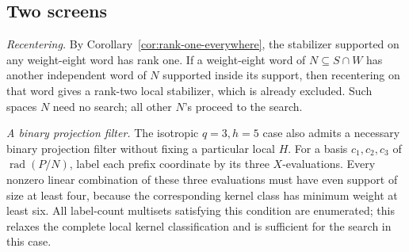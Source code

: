 \documentclass[11pt]{article}
\theoremstyle{definition}
\theoremstyle{remark}
\newcommand{\rad}{\operatorname{rad}}
\begin{document}
\subsection{Two screens}

\emph{Recentering.} By Corollary~\ref{cor:rank-one-everywhere}, the
stabilizer supported on any weight-eight word has rank one. If a
weight-eight word of \(N\subseteq S\cap W\) has another independent word
of \(N\) supported inside its support, then recentering on that word
gives a rank-two local stabilizer, which is already excluded. Such
spaces \(N\) need no search; all other \(N\)'s proceed to the search.

\emph{A binary projection filter.} The isotropic \(q=3,h=5\) case also
admits a necessary binary projection filter without fixing a particular
local \(H\). For a basis \(c_1,c_2,c_3\) of \(\rad(P/N)\), label each
prefix coordinate by its three \(X\)-evaluations. Every nonzero linear
combination of these three evaluations must have even support of size at
least four, because the corresponding kernel class has minimum weight at
least six. All label-count multisets satisfying this condition are
enumerated; this relaxes the complete local kernel classification and is
sufficient for the search in this case.
\end{document}
